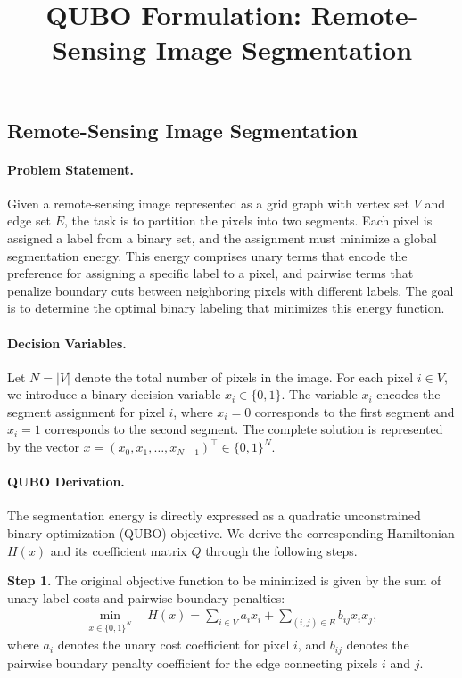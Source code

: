 \documentclass[12pt]{article}
\title{QUBO Formulation: Remote-Sensing Image Segmentation}
\date{}
\begin{document}
\maketitle

\subsection*{Remote-Sensing Image Segmentation}

\paragraph{Problem Statement.}
Given a remote-sensing image represented as a grid graph with vertex set $V$ and edge set $E$, the task is to partition the pixels into two segments. Each pixel is assigned a label from a binary set, and the assignment must minimize a global segmentation energy. This energy comprises unary terms that encode the preference for assigning a specific label to a pixel, and pairwise terms that penalize boundary cuts between neighboring pixels with different labels. The goal is to determine the optimal binary labeling that minimizes this energy function.

\paragraph{Decision Variables.}
Let $N = |V|$ denote the total number of pixels in the image. For each pixel $i \in V$, we introduce a binary decision variable $x_i \in \{0,1\}$. The variable $x_i$ encodes the segment assignment for pixel $i$, where $x_i = 0$ corresponds to the first segment and $x_i = 1$ corresponds to the second segment. The complete solution is represented by the vector $x = (x_0, x_1, \dots, x_{N-1})^\top \in \{0,1\}^N$.

\paragraph{QUBO Derivation.}
The segmentation energy is directly expressed as a quadratic unconstrained binary optimization (QUBO) objective. We derive the corresponding Hamiltonian $H(x)$ and its coefficient matrix $Q$ through the following steps.

\textbf{Step 1.} The original objective function to be minimized is given by the sum of unary label costs and pairwise boundary penalties:
\begin{align}
  \min_{x \in \{0,1\}^N} \quad H(x) = \sum_{i \in V} a_i x_i + \sum_{(i,j) \in E} b_{ij} x_i x_j,
\end{align}
where $a_i$ denotes the unary cost coefficient for pixel $i$, and $b_{ij}$ denotes the pairwise boundary penalty coefficient for the edge connecting pixels $i$ and $j$.
\end{document}

